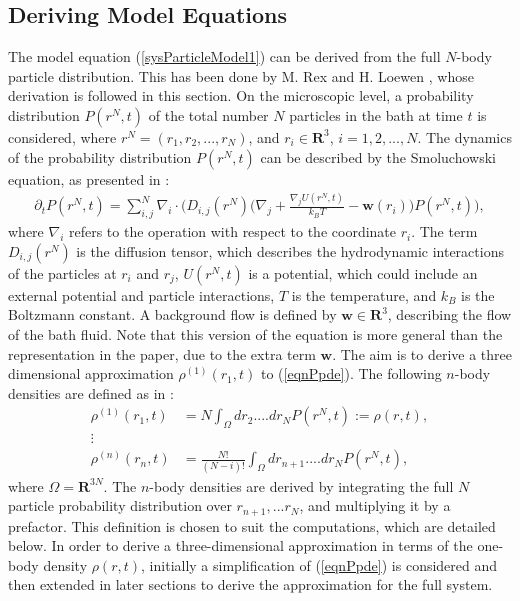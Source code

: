 \subsection{Deriving Model Equations}
The model equation (\ref{sysParticleModel1}) can be derived from the full $N$-body particle distribution. This has been done by M. Rex and H. Loewen \cite{RexLoewen1}, whose derivation is followed in this section.	
On the microscopic level, a probability distribution $P(r^N,t)$ of the total number $N$ particles in the bath at time $t$ is considered, where $r^N= (r_1, r_2,...,r_N)$, and $r_i \in \mathbf{R}^3$, $i=1,2,...,N$. 
The dynamics of the probability distribution $P(r^N,t)$ can be described by the Smoluchowski equation, as presented in \cite{RexLoewen1}:
\begin{align} \label{eqnPpde}
\partial_t P(r^N,t)= \sum_{i,j}^N \nabla_i \cdot \bigg( D_{i,j}(r^N) \bigg( \nabla_j + \frac{\nabla_j U(r^N,t)}{k_BT} - \mathbf{w}(r_i) \bigg) P(r^N,t) \bigg),
\end{align}
where $\nabla_i$ refers to the operation with respect to the coordinate $r_i$. The term $D_{i,j}(r^N)$ is the diffusion tensor, which describes the hydrodynamic interactions of the particles at $r_i$ and $r_j$, $U(r^N,t)$ is a potential, which could include an external potential and particle interactions, $T$ is the temperature, and $k_B$ is the Boltzmann constant. A background flow is defined by $\mathbf{w} \in \mathbf{R}^3$, describing the flow of the bath fluid.
 Note that this version of the equation is more general than the representation in the paper, due to the extra term $\mathbf{w}$. The aim is to derive a three dimensional approximation $\rho^{(1)}(r_1,t)$ to (\ref{eqnPpde}). The following $n$-body densities are defined as in \cite{RexLoewen1}:
\begin{align*}
\rho^{(1)}(r_1,t) &= N \int_\Omega dr_2.... dr_N P(r^N,t):= \rho(r,t),\\
\vdots\\
\rho^{(n)}(r_n,t) &= \frac{N!}{(N-i)!} \int_\Omega dr_{n+1}.... dr_N P(r^N,t),
\end{align*} 
where $\Omega=\mathbf{R}^{3N}$.
The $n$-body densities are derived by integrating the full $N$ particle probability distribution over $r_{n+1},...r_N$, and multiplying it by a prefactor. This definition is chosen to suit the computations, which are detailed below.
In order to derive a three-dimensional approximation in terms of the one-body density $\rho(r,t)$, initially a simplification of (\ref{eqnPpde}) is considered and then extended in later sections to derive the approximation for the full system. 

